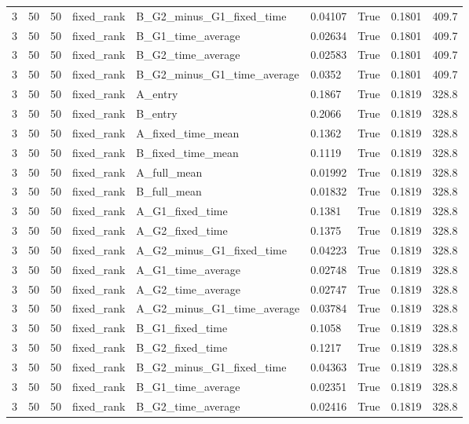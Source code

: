 \begin{longtable}{lllllllll}
3 & 50 & 50 & fixed\_rank & B\_G2\_minus\_G1\_fixed\_time & 0.04107 & True & 0.1801 & 409.7 \\
3 & 50 & 50 & fixed\_rank & B\_G1\_time\_average & 0.02634 & True & 0.1801 & 409.7 \\
3 & 50 & 50 & fixed\_rank & B\_G2\_time\_average & 0.02583 & True & 0.1801 & 409.7 \\
3 & 50 & 50 & fixed\_rank & B\_G2\_minus\_G1\_time\_average & 0.0352 & True & 0.1801 & 409.7 \\
3 & 50 & 50 & fixed\_rank & A\_entry & 0.1867 & True & 0.1819 & 328.8 \\
3 & 50 & 50 & fixed\_rank & B\_entry & 0.2066 & True & 0.1819 & 328.8 \\
3 & 50 & 50 & fixed\_rank & A\_fixed\_time\_mean & 0.1362 & True & 0.1819 & 328.8 \\
3 & 50 & 50 & fixed\_rank & B\_fixed\_time\_mean & 0.1119 & True & 0.1819 & 328.8 \\
3 & 50 & 50 & fixed\_rank & A\_full\_mean & 0.01992 & True & 0.1819 & 328.8 \\
3 & 50 & 50 & fixed\_rank & B\_full\_mean & 0.01832 & True & 0.1819 & 328.8 \\
3 & 50 & 50 & fixed\_rank & A\_G1\_fixed\_time & 0.1381 & True & 0.1819 & 328.8 \\
3 & 50 & 50 & fixed\_rank & A\_G2\_fixed\_time & 0.1375 & True & 0.1819 & 328.8 \\
3 & 50 & 50 & fixed\_rank & A\_G2\_minus\_G1\_fixed\_time & 0.04223 & True & 0.1819 & 328.8 \\
3 & 50 & 50 & fixed\_rank & A\_G1\_time\_average & 0.02748 & True & 0.1819 & 328.8 \\
3 & 50 & 50 & fixed\_rank & A\_G2\_time\_average & 0.02747 & True & 0.1819 & 328.8 \\
3 & 50 & 50 & fixed\_rank & A\_G2\_minus\_G1\_time\_average & 0.03784 & True & 0.1819 & 328.8 \\
3 & 50 & 50 & fixed\_rank & B\_G1\_fixed\_time & 0.1058 & True & 0.1819 & 328.8 \\
3 & 50 & 50 & fixed\_rank & B\_G2\_fixed\_time & 0.1217 & True & 0.1819 & 328.8 \\
3 & 50 & 50 & fixed\_rank & B\_G2\_minus\_G1\_fixed\_time & 0.04363 & True & 0.1819 & 328.8 \\
3 & 50 & 50 & fixed\_rank & B\_G1\_time\_average & 0.02351 & True & 0.1819 & 328.8 \\
3 & 50 & 50 & fixed\_rank & B\_G2\_time\_average & 0.02416 & True & 0.1819 & 328.8 \\

\end{longtable}
